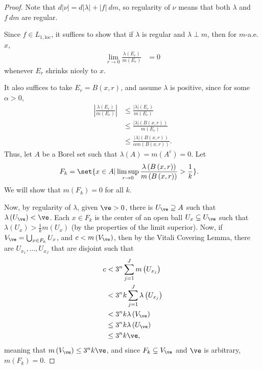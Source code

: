 \documentclass[10pt]{mypackage}
\begin{document}
 \begin{proof}
   Note that $d\left\vert \nu \right\vert = d\left\vert \lambda \right\vert + \left\vert f \right\vert\:dm$, so regularity of $\nu$ means that both $\lambda$ and $f\:dm$ are regular.\newline

   Since $f\in L_{1,\text{loc}}$, it suffices to show that if $\lambda$ is regular and $\lambda \perp m$, then for $m$-a.e. $x$,
   \begin{align*}
     \lim_{r\rightarrow 0} \frac{\lambda\left( E_r \right)}{m\left( E_r \right)} &= 0
   \end{align*}
   whenever $E_r$ shrinks nicely to $x$.\newline

   It also suffices to take $E_r = B\left( x,r \right)$, and assume $\lambda$ is positive, since for some $\alpha > 0$,
   \begin{align*}
     \left\vert \frac{\lambda\left( E_r \right)}{m\left( E_r \right)}  \right\vert &\leq \frac{\left\vert \lambda \right\vert\left( E_r \right)}{m\left( E_r \right)}\\
                                                                                   &\leq \frac{\left\vert \lambda \right\vert\left( B\left( x,r \right) \right)}{m\left( E_r \right)}\\
                                                                                   &\leq \frac{\left\vert \lambda \right\vert\left( B\left( x,r \right) \right)}{\alpha m\left( B\left( x,r \right) \right)}.
   \end{align*}
   Thus, let $A$ be a Borel set such that $\lambda\left( A \right) = m\left( A^{c} \right) = 0$. Let
   \begin{align*}
     F_k &= \set{x\in A | \limsup_{r\rightarrow 0} \frac{\lambda\left( B\left( x,r \right) \right)}{m\left( B\left( x,r \right) \right)} > \frac{1}{k}}.
   \end{align*}
   We will show that $m\left( F_k \right) = 0$ for all $k$.\newline

   Now, by regularity of $\lambda$, given $\ve > 0$, there is $U_{\ve} \supseteq A$ such that $\lambda\left( U_{\ve} \right) < \ve$. Each $x\in F_k$ is the center of an open ball $U_{x}\subseteq U_{\ve}$ such that $\lambda\left( U_x \right) > \frac{1}{k}m\left( U_{x} \right)$ (by the properties of the limit superior). Now, if $V_{\ve} = \bigcup_{x\in F_k} U_x$, and $c < m\left( V_{\ve} \right)$, then by the Vitali Covering Lemma, there are $U_{x_1},\dots,U_{x_J}$ that are disjoint such that
   \begin{align*}
     c &< 3^{n}\sum_{j=1}^{J} m\left( U_{x_j} \right)\\
       &< 3^{n}k\sum_{j=1}^{J} \lambda\left( U_{x_j} \right)\\
       &< 3^{n}k\lambda\left( V_{\ve} \right)\\
       &\leq 3^{n}k\lambda\left( U_{\ve} \right)\\
       &\leq 3^{n}k\ve,
   \end{align*}
   meaning that $m\left( V_{\ve} \right) \leq 3^{n}k\ve$, and since $F_k\subseteq V_{\ve}$ and $\ve$ is arbitrary, $m\left( F_k \right) = 0$.
 \end{proof}
\end{document}
